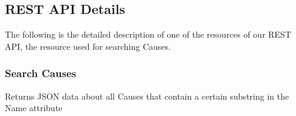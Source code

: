 \subsection{REST API Details}

The following is the detailed description of one of the resources of our REST API, the resource used for searching Causes.

\subsubsection*{Search Causes}


Returns JSON data about all Causes that contain a certain substring in the Name attribute 


